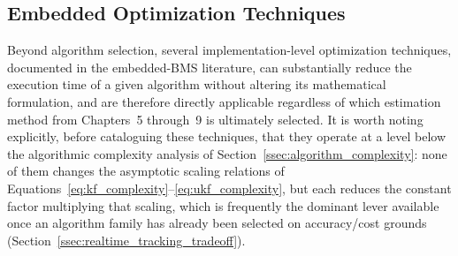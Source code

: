 \subsection{Embedded Optimization Techniques}
\label{ssec:embedded_optimization}

Beyond algorithm selection, several implementation-level optimization techniques, documented in the embedded-BMS literature, can substantially reduce the execution time of a given algorithm without altering its mathematical formulation, and are therefore directly applicable regardless of which estimation method from Chapters~5 through~9 is ultimately selected. It is worth noting explicitly, before cataloguing these techniques, that they operate at a level below the algorithmic complexity analysis of Section~\ref{ssec:algorithm_complexity}: none of them changes the asymptotic scaling relations of Equations~\eqref{eq:kf_complexity}--\eqref{eq:ukf_complexity}, but each reduces the constant factor multiplying that scaling, which is frequently the dominant lever available once an algorithm family has already been selected on accuracy/cost grounds (Section~\ref{ssec:realtime_tracking_tradeoff}).

